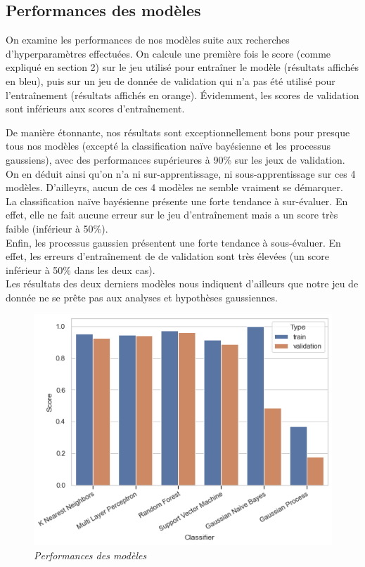 \subsection{Performances des modèles}

On examine les performances de nos modèles suite aux recherches d'hyperparamètres effectuées. On calcule une première fois le score (comme expliqué en section 2) sur le jeu utilisé pour entraîner le modèle (résultats affichés en bleu), puis sur un jeu de donnée de validation qui n'a pas été utilisé pour l'entraînement (résultats affichés en orange). Évidemment, les scores de validation sont inférieurs aux scores d'entraînement.

De manière étonnante, nos résultats sont exceptionnellement bons pour presque tous nos modèles (excepté la classification naïve bayésienne et les processus gaussiens), avec des performances supérieures à 90\% sur les jeux de validation.\\

On en déduit ainsi qu'on n'a ni sur-apprentissage, ni sous-apprentissage sur ces 4 modèles. D'ailleyrs, aucun de ces 4 modèles ne semble vraiment se démarquer.\\

La classification naïve bayésienne présente une forte tendance à sur-évaluer. En effet, elle ne fait aucune erreur sur le jeu d'entraînement mais a un score très faible (inférieur à 50\%).\\

Enfin, les processus gaussien présentent une forte tendance à sous-évaluer. En effet, les erreurs d'entraînement de de validation sont très élevées (un score inférieur à 50\% dans les deux cas).\\

Les résultats des deux derniers modèles nous indiquent d'ailleurs que notre jeu de donnée ne se prête pas aux analyses et hypothèses gaussiennes.\\

\begin{figure}[h]
    \centering
    \includegraphics[scale=1]{Images/graphiques/results_barplot_V3.png}
    \caption{\it{Performances des modèles}}
    \label{fig:species_repartition}
\end{figure}